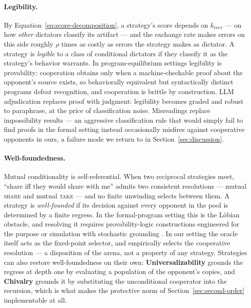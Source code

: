 \paragraph{Legibility.}
By Equation~\eqref{eq:score-decomposition}, a strategy's score
depends on $k_{\mathrm{recv}}$ --- on how \emph{other} dictators
classify its artifact --- and the exchange rate makes errors on this
side roughly $\rho$ times as costly as errors the strategy makes as
dictator.
A strategy is \emph{legible} to a class of conditional dictators if
they classify it as the strategy's behavior warrants.
In program-equilibrium settings legibility is provability:
cooperation obtains only when a machine-checkable proof about the
opponent's source exists, so behaviorally equivalent but
syntactically distinct programs defeat recognition, and cooperation
is brittle by construction.
LLM adjudication replaces proof with judgment: legibility becomes
graded and robust to paraphrase, at the price of classification
noise.
Misreadings replace impossibility results --- an aggressive
classification rule that would simply fail to find proofs in the
formal setting instead occasionally misfires against cooperative
opponents in ours, a failure mode we return to in
Section~\ref{sec:discussion}.

\paragraph{Well-foundedness.}
Mutual conditionality is self-referential.
When two reciprocal strategies meet, ``share iff they would share
with me'' admits two consistent resolutions --- mutual
\textup{\textsc{share}} and mutual \textup{\textsc{take}} --- and no
finite unwinding selects between them.
A strategy is \emph{well-founded} if its decision against every
opponent in the pool is determined by a finite regress.
In the formal-program setting this is the L\"obian obstacle, and
resolving it requires provability-logic constructions engineered for
the purpose \citep{barasz2014robust} or simulation with stochastic
grounding \citep{oesterheld2019robust}.
In our setting the oracle itself acts as the fixed-point selector,
and empirically selects the cooperative resolution --- a disposition
of the arena, not a property of any strategy.
Strategies can also restore well-foundedness on their own:
\textbf{Universalizability} grounds the regress at depth one by
evaluating a population of the opponent's copies, and
\textbf{Chivalry} grounds it by substituting the unconditional
cooperator into the recursion, which is what makes the protective
norm of Section~\ref{sec:second-order} implementable at all.
